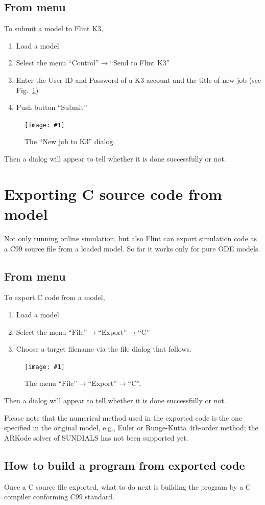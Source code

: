 \documentclass[a4paper,10pt]{report}
\newcommand\FigureOfImage[2]{\begin{figure}[h]
  \centering
  \texttt{[image: \#1]}
  \caption{#2}\label{fig:#1}
\end{figure}}
\begin{document}
\subsection{From menu}
To submit a model to Flint K3,
\begin{enumerate}
\item Load a model
\item Select the menu ``Control''$\rightarrow$``Send to Flint K3''
\item Enter the User ID and Password of a K3 account and the title of new job
  (see Fig.~\ref{fig:new-job-to-k3})
\item Push button ``Submit''
\end{enumerate}
\FigureOfImage{new-job-to-k3}{The ``New job to K3'' dialog.}
Then a dialog will appear to tell whether it is done successfully or not.

\section{Exporting C source code from model}
Not only running online simulation, but also Flint can export simulation code
as a C99 source file from a loaded model. So far it works only for pure ODE models.

\subsection{From menu}
To export C code from a model,
\begin{enumerate}
\item Load a model
\item Select the menu ``File''$\rightarrow$``Export''$\rightarrow$``C''
\item Choose a target filename via the file dialog that follows.
\end{enumerate}
\FigureOfImage{export-to-c}{The menu ``File''$\rightarrow$``Export''$\rightarrow$``C''.}
Then a dialog will appear to tell whether it is done successfully or not.

Please note that the numerical method used in the exported code is the one
specified in the original model, e.g., Euler or Runge-Kutta 4th-order method;
the ARKode solver of SUNDIALS has not been supported yet.

\subsection{How to build a program from exported code}
Once a C source file exported, what to do next is building the program by a C compiler
conforming C99 standard.
\end{document}
